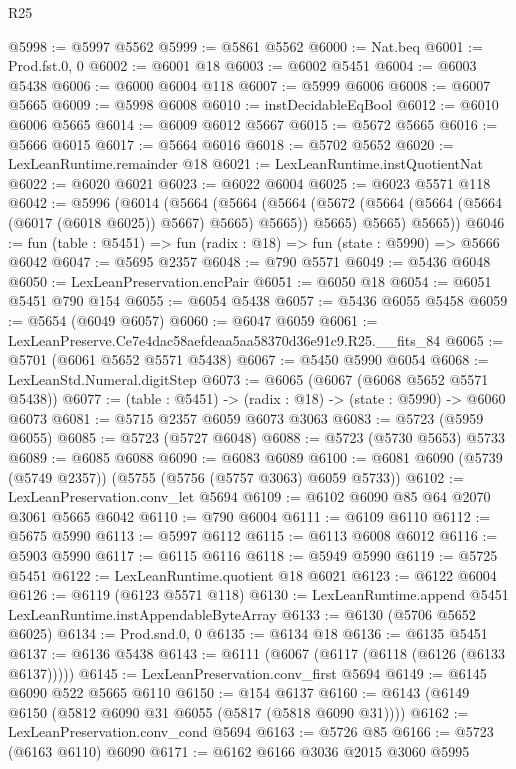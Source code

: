 \begin{lexlean}{R25}
\begin{coremodule}
@5998 := @5997 @5562
@5999 := @5861 @5562
@6000 := Nat.beq
@6001 := Prod.fst.{0, 0}
@6002 := @6001 @18
@6003 := @6002 @5451
@6004 := @6003 @5438
@6006 := @6000 @6004 @118
@6007 := @5999 @6006
@6008 := @6007 @5665
@6009 := @5998 @6008
@6010 := instDecidableEqBool
@6012 := @6010 @6006 @5665
@6014 := @6009 @6012 @5667
@6015 := @5672 @5665
@6016 := @5666 @6015
@6017 := @5664 @6016
@6018 := @5702 @5652
@6020 := LexLeanRuntime.remainder @18
@6021 := LexLeanRuntime.instQuotientNat
@6022 := @6020 @6021
@6023 := @6022 @6004
@6025 := @6023 @5571 @118
@6042 := @5996
    (@6014
      (@5664
        (@5664
          (@5664 (@5672 (@5664 (@5664 (@5664 (@6017 (@6018 @6025)) @5667) @5665) @5665)) @5665)
          @5665)
        @5665))
@6046 := fun (table : @5451) => fun (radix : @18) => fun (state : @5990) => @5666 @6042
@6047 := @5695 @2357
@6048 := @790 @5571
@6049 := @5436 @6048
@6050 := LexLeanPreservation.encPair
@6051 := @6050 @18
@6054 := @6051 @5451 @790 @154
@6055 := @6054 @5438
@6057 := @5436 @6055 @5458
@6059 := @5654 (@6049 @6057)
@6060 := @6047 @6059
@6061 := LexLeanPreserve.Ce7e4dac58aefdeaa5aa58370d36e91c9.R25.__fits_84
@6065 := @5701 (@6061 @5652 @5571 @5438)
@6067 := @5450 @5990 @6054
@6068 := LexLeanStd.Numeral.digitStep
@6073 := @6065 (@6067 (@6068 @5652 @5571 @5438))
@6077 := (table : @5451) -> (radix : @18) -> (state : @5990) -> @6060 @6073
@6081 := @5715 @2357 @6059 @6073 @3063
@6083 := @5723 (@5959 @6055)
@6085 := @5723 (@5727 @6048)
@6088 := @5723 (@5730 @5653) @5733
@6089 := @6085 @6088
@6090 := @6083 @6089
@6100 := @6081 @6090 (@5739 (@5749 @2357)) (@5755 (@5756 (@5757 @3063) @6059 @5733))
@6102 := LexLeanPreservation.conv_let @5694
@6109 := @6102 @6090 @85 @64 @2070 @3061 @5665 @6042
@6110 := @790 @6004
@6111 := @6109 @6110
@6112 := @5675 @5990
@6113 := @5997 @6112
@6115 := @6113 @6008 @6012
@6116 := @5903 @5990
@6117 := @6115 @6116
@6118 := @5949 @5990
@6119 := @5725 @5451
@6122 := LexLeanRuntime.quotient @18 @6021
@6123 := @6122 @6004
@6126 := @6119 (@6123 @5571 @118)
@6130 := LexLeanRuntime.append @5451 LexLeanRuntime.instAppendableByteArray
@6133 := @6130 (@5706 @5652 @6025)
@6134 := Prod.snd.{0, 0}
@6135 := @6134 @18
@6136 := @6135 @5451
@6137 := @6136 @5438
@6143 := @6111 (@6067 (@6117 (@6118 (@6126 (@6133 @6137)))))
@6145 := LexLeanPreservation.conv_first @5694
@6149 := @6145 @6090 @522 @5665 @6110
@6150 := @154 @6137
@6160 := @6143 (@6149 @6150 (@5812 @6090 @31 @6055 (@5817 (@5818 @6090 @31))))
@6162 := LexLeanPreservation.conv_cond @5694
@6163 := @5726 @85
@6166 := @5723 (@6163 @6110) @6090
@6171 := @6162 @6166 @3036 @2015 @3060 @5995

\end{coremodule}
\end{lexlean}
